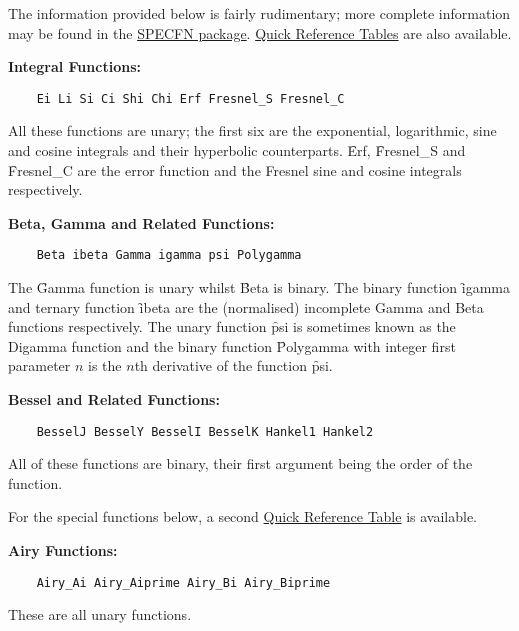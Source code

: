 The information provided below is fairly rudimentary; more complete
information may be found in the \hyperlink{SPECFNS}{SPECFN package}.
\hyperlink{SPECFNTAB1}{Quick Reference Tables} are also available.

 
\textbf{Integral Functions:}
\begin{verbatim}
    Ei Li Si Ci Shi Chi Erf Fresnel_S Fresnel_C
\end{verbatim}
All these functions are unary;
the first six are the exponential, logarithmic, sine and
cosine integrals and their hyperbolic counterparts. \f{Erf},
\f{Fresnel\_S} and \f{Fresnel\_C} are the error function and the Fresnel
sine and cosine integrals respectively.

\textbf{Beta, Gamma and Related Functions:}
\begin{verbatim}
    Beta ibeta Gamma igamma psi Polygamma
\end{verbatim}
The \f{Gamma} function is unary whilst \f{Beta} is binary.
The binary function \f{igamma} and ternary function \f{ibeta}
are the (normalised) incomplete Gamma and Beta functions respectively.
The unary function \f{psi} is sometimes known as the Digamma function and
the binary function \f{Polygamma} with integer first parameter $n$ is the
$n$th derivative of the function \f{psi}.

\textbf{Bessel and Related Functions:}
\begin{verbatim}
    BesselJ BesselY BesselI BesselK Hankel1 Hankel2
\end{verbatim}
All of these functions are binary, their first argument being the
order of the function.

For the special functions below, a second
\hyperlink{SPECFNTAB2}{Quick Reference Table} is available.

\textbf{Airy Functions:}
\begin{verbatim}
    Airy_Ai Airy_Aiprime Airy_Bi Airy_Biprime
\end{verbatim}
These are all unary functions.

